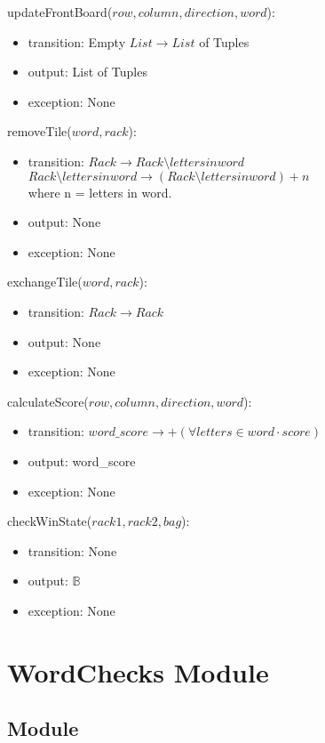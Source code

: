 \documentclass[12pt]{article}
\begin{document}
\noindent updateFrontBoard($row, column, direction, word$):
\begin{itemize}
\item transition: Empty $List \rightarrow List$ of Tuples
\item output: List of Tuples
\item exception: None
\end{itemize}

\noindent removeTile($word, rack$):
\begin{itemize}
\item transition: $Rack \rightarrow Rack \setminus {letters in word}$ \\
$Rack \setminus {letters in word} \rightarrow (Rack \setminus {letters in word}) + n$\\
where n = letters in word.
\item output: None
\item exception: None
\end{itemize}

\noindent exchangeTile($word, rack$):
\begin{itemize}
\item transition: $Rack \rightarrow Rack$
\item output: None
\item exception: None
\end{itemize}

\noindent calculateScore($row, column, direction, word$):
\begin{itemize}
\item transition: $word\_score \rightarrow +(\forall letters \in word \cdot score)$
\item output: word\_score
\item exception: None
\end{itemize}

\noindent checkWinState($rack1, rack2, bag$):
\begin{itemize}
\item transition: None
\item output: $\mathbb{B}$
\item exception: None
\end{itemize}

\newpage

\section* {WordChecks Module}

\subsection*{Module}
\end{document}

